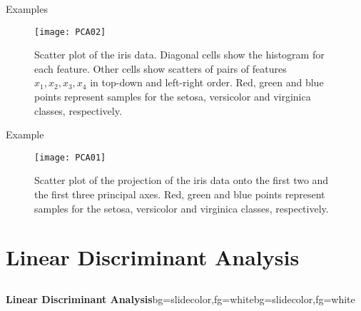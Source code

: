\begin{frame}{Examples}
\begin{figure}
\texttt{[image: PCA02]}
\caption{Scatter plot of the iris data. Diagonal cells show the histogram for each feature. Other cells show scatters of pairs of features $x_1, x_2, x_3, x_4$ in
top-down and left-right order. Red, green and blue points represent samples for the setosa, versicolor and virginica classes, respectively.}
\end{figure}
\end{frame}

\begin{frame}{Example}
\begin{figure}
\texttt{[image: PCA01]}
\caption{Scatter plot of the projection of the iris data onto the first two and the first three principal axes. Red, green and blue points represent samples for the setosa, versicolor and virginica classes, respectively.}
\end{figure}
\end{frame}

\section[LDA]{Linear Discriminant Analysis}
\subsection{}

\begin{frame}{}
\begin{variableblock}{\centering \Large \textbf{\vspace{4pt}\newline Linear Discriminant Analysis\vspace{4pt}}}{bg=slidecolor,fg=white}{bg=slidecolor,fg=white}
\end{variableblock}
\end{frame}


